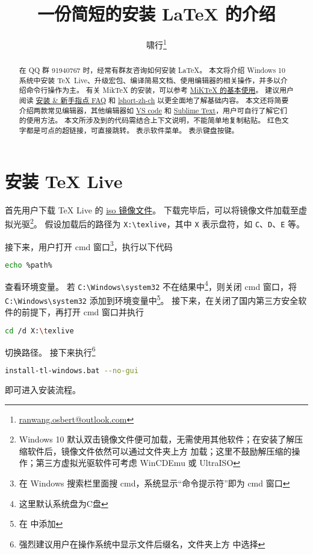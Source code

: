\documentclass{ctexart}
\title{\bfseries 一份简短的安装 \LaTeX{} 的介绍}
\author{啸行\thanks{\url{ranwang.osbert@outlook.com}}}
\begin{document}
  
\maketitle

\begin{abstract}
在 QQ 群 91940767 时，经常有群友咨询如何安装 \LaTeX{}。
本文将介绍 Windows 10 系统中安装 \TeX{}~Live、升级宏包、编译简易文档、使用编辑器的相关操作，并多以介绍命令行操作为主。
有关 Mik\TeX{} 的安装，可以参考 \href{https://camuseblog.top/2019-03-02-/MiKTeX/}{MiK\TeX{} 的基本使用}。
建议用户阅读 \href{http://www.latexstudio.net/archives/11469.html}{\LaTeXe{} 安装 \& 新手指点 FAQ} 和 \href{http://mirrors.ctan.org/info/lshort/chinese/lshort-zh-cn.pdf}{lshort-zh-ch} 以更全面地了解基础内容。
本文还将简要介绍两款常见编辑器，其他编辑器如 \href{https://github.com/EthanDeng/vscode-latex}{VS code} 和 \href{https://github.com/EthanDeng/sublime-text-latex}{Sublime Text}，用户可自行了解它们的使用方法。
本文所涉及到的代码需结合上下文说明，不能简单地复制粘贴。
红色文字都是可点的超链接，可直接跳转。
 表示软件菜单。
 表示键盘按键。

\end{abstract}

\section{安装 \TeX{} Live}
首先用户下载 \TeX{} Live 的 \href{http://mirrors.ctan.org/systems/texlive/Images/texlive.iso}{iso 镜像文件}。
下载完毕后，可以将镜像文件加载至虚拟光驱\footnote{Windows 10 默认双击镜像文件便可加载，无需使用其他软件；在安装了解压缩软件后，镜像文件依然可以通过文件夹上方  加载；这里不鼓励解压缩的操作；第三方虚拟光驱软件可考虑 WinCDEmu 或 UltraISO}。
假设加载后的路径为 \texttt{X:\textbackslash texlive}，其中 \texttt{X} 表示盘符，如 \texttt{C}、\texttt{D}、\texttt{E} 等。

接下来，用户打开 \textsf{cmd} 窗口\footnote{在 Windows 搜索栏里面搜 cmd，系统显示“命令提示符”即为 \textsf{cmd} 窗口}，执行以下代码
\begin{lstlisting}[language = bash]
  echo %path%
\end{lstlisting}
查看环境变量。
若 \texttt{C:\textbackslash Windows\textbackslash system32} 不在结果中\footnote{这里默认系统盘为\textsf{C}盘}，则关闭 \textsf{cmd} 窗口，将 \texttt{C:\textbackslash Windows\textbackslash system32} 添加到环境变量中\footnote{在  中添加}。
接下来，在关闭了国内第三方安全软件的前提下，再打开 \textsf{cmd} 窗口并执行
\begin{lstlisting}[language = bash]
  cd /d X:\texlive
\end{lstlisting}
切换路径。
接下来执行\footnote{强烈建议用户在操作系统中显示文件后缀名，文件夹上方  中选择 }
\begin{lstlisting}[language = bash]
  install-tl-windows.bat --no-gui
\end{lstlisting}
即可进入安装流程。
\end{document}
